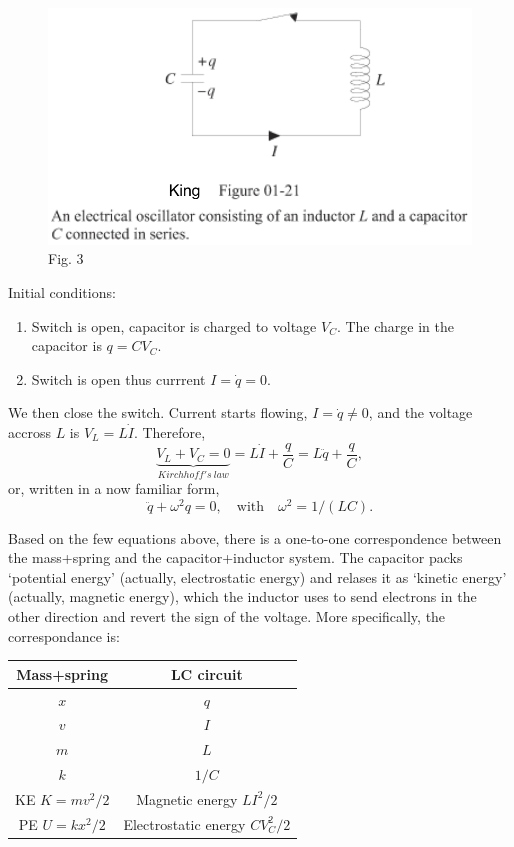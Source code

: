 \documentclass[11pt]{article}
\makeatletter
\def\maxwidth{\ifdim\Gin@nat@width>\linewidth\linewidth
    \else\Gin@nat@width\fi}
\let\Oldincludegraphics\includegraphics
\renewcommand{\includegraphics}[1]{\Oldincludegraphics[width=.8\maxwidth]{#1}}
\makeatother
\begin{document}
    \begin{figure}
\centering
\includegraphics{LC_circuit.png}
\caption{Fig. 3}
\end{figure}

    Initial conditions:

\begin{enumerate}
\def\labelenumi{\arabic{enumi}.}
\item
  Switch is open, capacitor is charged to voltage \(V_C\). The charge in
  the capacitor is \(q = CV_C\).
\item
  Switch is open thus currrent \(I=\dot{q} = 0\).
\end{enumerate}

    We then close the switch. Current starts flowing, \(I = \dot q \neq 0\),
and the voltage accross \(L\) is \(V_L = L \dot I\). Therefore,
\[ \underbrace{V_L+V_C = 0}_{Kirchhof\!f's\ law} = L\dot I + \frac{q}C  = L\ddot q + \frac{q}C, \]
or, written in a now familiar form,
\[ \boxed{\ddot q + \omega^2 q = 0, \quad \textrm{with}\quad \omega^2 = 1/(LC).} \]

    Based on the few equations above, there is a one-to-one correspondence
between the mass+spring and the capacitor+inductor system. The capacitor
packs `potential energy' (actually, electrostatic energy) and relases it
as `kinetic energy' (actually, magnetic energy), which the inductor uses
to send electrons in the other direction and revert the sign of the
voltage. More specifically, the correspondance is:

    \begin{longtable}[]{@{}cc@{}}
\toprule
Mass+spring & LC circuit\tabularnewline
\midrule
\endhead
\(x\) & \(q\)\tabularnewline
\(v\) & \(I\)\tabularnewline
\(m\) & \(L\)\tabularnewline
\(k\) & \(1/C\)\tabularnewline
KE \(K = mv^2/2\) & Magnetic energy \(LI^2/2\)\tabularnewline
PE \(U = kx^2/2\) & Electrostatic energy \(CV_C^2/2\)\tabularnewline
\bottomrule
\end{longtable}


    
    
    
    
\end{document}
